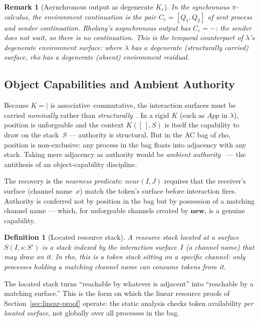 \documentclass[11pt,a4paper]{article}
\newtheorem{definition}[theorem]{Definition}
\newtheorem{remark}[theorem]{Remark}
\newcommand{\Par}{\mathbin{|}}
\begin{document}
\begin{remark}[Asynchronous output as degenerate $K_e$]
  \label{rem:async}
  In the synchronous $\pi$-calculus, the environment continuation
  is the pair $C_e = [Q_1, Q_2]$ of sent process and sender
  continuation.  Rholang's asynchronous output has $C_e = -$:
  the sender does not wait, so there is no continuation.  This
  is the temporal counterpart of $\lambda$'s degenerate
  environment surface: where $\lambda$ has a degenerate
  (structurally carried) surface, rho has a degenerate (absent)
  environment residual.
\end{remark}

\subsection{Object Capabilities and Ambient Authority}
\label{sec:ocap-authority}

Because $K = \Par$ is associative--commutative, the interaction
surfaces must be carried \emph{nominally} rather than
\emph{structurally}~\cite{CostEndofunctor}.  In a rigid $K$
(such as $\mathit{App}$ in $\lambda$), position is
unforgeable and the context $K([\,], S)$ is itself the
capability to draw on the stack~$S$ --- authority is
structural.  But in the AC bag of rho, position is
non-exclusive: any process in the bag floats into adjacency
with any stack.  Taking mere adjacency as authority would be
\emph{ambient authority}~\cite{MillerYeeShapiro2003,
MillerPhD2006} --- the antithesis of an object-capability
discipline.

The recovery is the \emph{nearness predicate}:
$\mathit{near}(I, J)$ requires that the receiver's surface
(channel name~$x$) match the token's surface before
interaction fires.  Authority is conferred not by position in
the bag but by possession of a matching channel name --- which,
for unforgeable channels created by $\mathbf{new}$, is a
genuine capability.

\begin{definition}[Located resource stack]
  \label{def:located-stack}
  A resource stack \emph{located at a surface}
  $S(I, s : S')$ is a stack indexed by the interaction
  surface~$I$ (a channel name) that may draw on it.  In rho,
  this is a token stack sitting on a specific channel: only
  processes holding a matching channel name can consume tokens
  from it.
\end{definition}

\noindent
The located stack turns ``reachable by whatever is adjacent''
into ``reachable by a matching surface.''  This is the form on
which the linear resource proofs of
Section~\ref{sec:linear-proof} operate: the static analysis
checks token availability \emph{per located surface}, not
globally over all processes in the bag.
\end{document}
